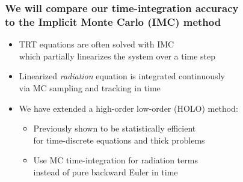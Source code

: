 \documentclass[xcolor=dvipsnames,hyperref={pdfpagelabels=false},unknownkeysallowed]{beamer}
\newcommand{\colb}[1]{{\color{blue} #1}}
\newcommand{\colG}[1]{{\color{Gray!110} #1}}
\newlength{\wideitemsep}
\let\olditem\item
\renewcommand{\item}{\setlength{\itemsep}{\wideitemsep}\olditem}
\begin{document}
\begin{frame}
    \frametitle{We will compare our time-integration accuracy \\ to the \textbf{Implicit Monte Carlo} (IMC) method}
{\addtolength{\leftmargini}{-0.3in}
   \begin{itemize}
        \item[] TRT equations are often solved with IMC \\
            \colG{which partially linearizes the system over a time step}
        \item[] Linearized \emph{radiation} equation is integrated \colb{continuously}
            \\ \colG{via MC sampling and tracking in time}
            \pause
        \item[] We have extended a \colb{high-order low-order (HOLO)} method:  \\ 
            \begin{itemize}
            \vspace{0.02in}
                 \item[] Previously shown to be statistically efficient \\ \colG{for time-discrete equations and thick problems}
                 \item[] Use MC time-integration for radiation terms \\ \colG{instead of pure backward Euler in time}
           \end{itemize}
   \end{itemize}
   }
\end{frame}
\end{document}
